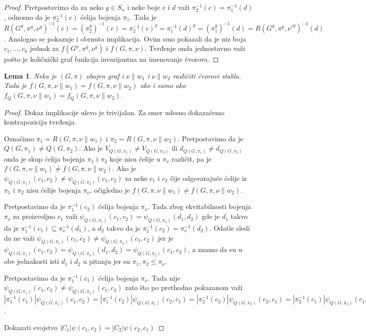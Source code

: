 \documentclass[12pt,oneside]{memoir}
\newtheorem{lemma}{Lema}
\theoremstyle{definition}
\begin{document}
  \begin{proof}
	  Pretpostavimo da za neko $g \in S_n$ i neke boje $c$ i $d$ važi
	  $\pi_2^{-1}(c) = \pi_1^{-1}(d)$, odnosno da je $\pi_2^{-1}(c)$ ćelija
	  bojenja $\pi_1$.  Tada je $R(G^g, \pi^g, \nu^g)^{-1}(c) =
	  (\pi_2^g)^{-1}(c) = \pi_2^{-1}(c)^g = \pi_1^{-1}(d)^g = (\pi_1^g)^{-1}(d)
	  = R(G^g, \pi^g, \nu'^g)^{-1}(d)$. Analogno se pokazuje i obrnuta
	  implikacija.  Ovim smo pokazali da je niz boja $c_1, \dots, c_k$ jednak
	  za $f(G^g, \pi^g, \nu^g)$ i $f(G, \pi, \nu)$. Tvrđenje onda jednostavno
	  važi pošto je količnički graf funkcija invarijantna na imenovanje
	  čvorova.
  \end{proof}

  \begin{lemma}
	  Neka je $(G, \pi)$ obojen graf i $\nu \| w_1$ i $\nu \| w_2$ različiti
	  čvorovi stabla. Tada je $f(G, \pi, \nu \| w_1) = f(G, \pi, \nu \| w_2)$
	  ako i samo ako $f_Q(G, \pi, \nu \| w_1) = f_Q(G, \pi, \nu \| w_2)$.
  \end{lemma}
  
  \begin{proof}
	  Dokaz implikacije ulevo je trivijalan. Za smer udesno dokazaćemo
	  kontrapoziciju tvrđenja.

	  Označimo $\pi_1 = R(G, \pi, \nu \| w_1)$ i $\pi_2 = R(G, \pi, \nu \|
	  w_2)$. Pretpostavimo da je $Q(G, \pi_1) \neq Q(G, \pi_2)$. Ako je
	  $V_{Q(G, \pi_1)} \neq V_{Q(G, \pi_2)}$ ili $d_{Q(G, \pi_1)} \neq d_{Q(G,
	  \pi_2)}$ onda je skup ćelija bojenja $\pi_1$ i $\pi_2$ koje nisu ćelije u
	  $\pi_\nu$ različit, pa je $f(G, \pi, \nu \| w_1) \neq f(G, \pi, \nu \|
	  w_2)$. Ako je $\psi_{Q(G, \pi_1)}(c_1, c_2) \neq \psi_{Q(G, \pi_2)}(c_1,
	  c_2)$ za neke $c_1$ i $c_2$ čije odgovarajuće ćelije iz $\pi_1$ i $\pi_2$
	  nisu ćelije bojenja $\pi_\nu$, očigledno je $f(G, \pi, \nu \| w_1) \neq
	  f(G, \pi, \nu \| w_2)$.

	  Pretpostavimo da je $\pi_1^{-1}(c_2)$ ćelija bojenja $\pi_\nu$. Tada zbog
	  ekvitabilnosti bojenja $\pi_\nu$ za proizvoljno $c_1$ važi $\psi_{Q(G,
	  \pi_1)}(c_1, c_2) = \psi_{Q(G, \pi_\nu)}(d_1, d_2)$ gde je $d_1$ takvo da
	  je $\pi_1^{-1}(c_1) \subseteq \pi_\nu^{-1}(d_1)$, a $d_2$ takvo da je
	  $\pi_1^{-1}(c_2) = \pi_\nu^{-1}(d_2)$. Odatle sledi da ne važi
	  $\psi_{Q(G, \pi_1)}(c_1, c_2) \neq \psi_{Q(G, \pi_2)}(c_1, c_2)$ jer je
	  $\psi_{Q(G, \pi_1)}(c_1, c_2) = \psi_{Q(G, \pi_\nu)}(d_1, d_2) =
	  \psi_{Q(G, \pi_2)}(c_1, c_2)$, a znamo da su u obe jednakosti isti $d_1$
	  i $d_2$ u pitanju jer su $\pi_1, \pi_2 \leq \pi_\nu$.

	  Pretpostavimo da je $\pi_1^{-1}(c_1)$ ćelija bojenja $\pi_\nu$. Tada nije
	  $\psi_{Q(G, \pi_1)}(c_1, c_2) \neq \psi_{Q(G, \pi_2)}(c_1, c_2)$ zato što
	  po prethodno pokazanom važi $|\pi_1^{-1}(c_1)|\psi_{Q(G, \pi_1)}(c_1,
	  c_2) = |\pi_1^{-1}(c_2)|\psi_{Q(G, \pi_1)}(c_2, c_1) =
	  |\pi_2^{-1}(c_2)|\psi_{Q(G, \pi_2)}(c_2, c_1) =
	  |\pi_2^{-1}(c_1)|\psi_{Q(G, \pi_2)}(c_1, c_2)$.

	  {\color{red} Dokazati svojstvo $|C_1|\psi(c_1, c_2) = |C_2|\psi(c_2, c_1)$}
  \end{proof}
\end{document}
